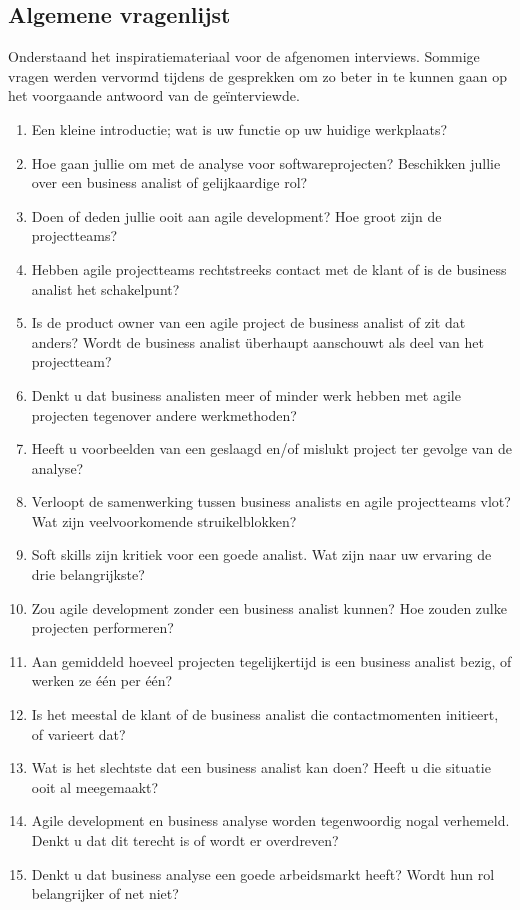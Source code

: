 \documentclass{hogent-article}
\begin{document}
\subsection{Algemene vragenlijst}

Onderstaand het inspiratiemateriaal voor de afgenomen interviews. Sommige vragen werden vervormd
tijdens de gesprekken om zo beter in te kunnen gaan op het voorgaande antwoord van de geïnterviewde.

\vspace{5pt}

\begin{enumerate}[label=\bfseries\Alph* |]
  \item Een kleine introductie; wat is uw functie op uw huidige werkplaats?
  \item Hoe gaan jullie om met de analyse voor softwareprojecten? Beschikken jullie over een business analist of gelijkaardige rol?
  \item Doen of deden jullie ooit aan agile development? Hoe groot zijn de projectteams? 
  \item Hebben agile projectteams rechtstreeks contact met de klant of is de business analist het schakelpunt?
  \item Is de product owner van een agile project de business analist of zit dat anders? Wordt de business analist überhaupt aanschouwt als deel van het projectteam?
  \item Denkt u dat business analisten meer of minder werk hebben met agile projecten tegenover andere werkmethoden?
  \item Heeft u voorbeelden van een geslaagd en/of mislukt project ter gevolge van de analyse?
  \item Verloopt de samenwerking tussen business analists en agile projectteams vlot? Wat zijn veelvoorkomende struikelblokken?
  \item Soft skills zijn kritiek voor een goede analist. Wat zijn naar uw ervaring de drie belangrijkste?
  \item Zou agile development zonder een business analist kunnen? Hoe zouden zulke projecten performeren?
  \item Aan gemiddeld hoeveel projecten tegelijkertijd is een business analist bezig, of werken ze één per één?
  \item Is het meestal de klant of de business analist die contactmomenten initieert, of varieert dat?
  \item Wat is het slechtste dat een business analist kan doen? Heeft u die situatie ooit al meegemaakt?
  \item Agile development en business analyse worden tegenwoordig nogal verhemeld. Denkt u dat dit terecht is of wordt er overdreven?
  \item Denkt u dat business analyse een goede arbeidsmarkt heeft? Wordt hun rol belangrijker of net niet?
\end{enumerate}
 
\end{document}
